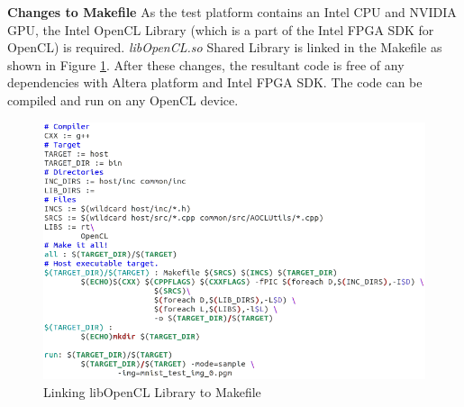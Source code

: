 \textbf{Changes to Makefile}\newline
As the test platform contains an Intel CPU and NVIDIA GPU, the Intel OpenCL Library (which is a part of the Intel FPGA SDK for OpenCL) is required. \textit{libOpenCL.so} Shared Library is linked in the Makefile as shown in Figure \ref{fig:makefile}.\newline \newline
After these changes, the resultant code is free of any dependencies with Altera platform and Intel FPGA SDK. The code can be compiled and run on any OpenCL device.
\begin{figure}[h!]
\centering
\includegraphics[width=0.7\linewidth]{figures/makefile.png}
\caption{Linking libOpenCL Library to Makefile}
\label{fig:makefile}
\end{figure}

